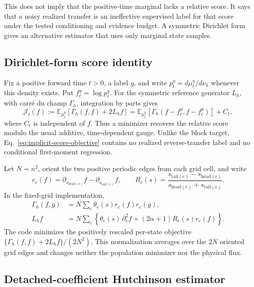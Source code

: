 \documentclass[11pt]{article}
\numberwithin{equation}{section}
\newcommand{\E}{\mathbb E}
\newcommand{\1}{\mathbf 1}
\begin{document}
This does not imply that the positive-time marginal lacks a relative score.
It says that a noisy realized transfer is an ineffective supervised label for
that score under the tested conditioning and evidence budget.  A symmetric
Dirichlet form gives an alternative estimator that uses only marginal state
samples.

\subsection{Dirichlet-form score identity}

Fix a positive forward time \(t>0\), a label \(y\), and write
\(p_t^y=d\mu_t^y/d\nu_h\) whenever this density exists.  Put
\(f_t^y=\log p_t^y\).  For the symmetric reference generator \(L_h\), with
carr\'e du champ \(\Gamma_h\), integration by parts gives
\begin{equation}\label{eq:implicit-score-objective}
  \mathcal J_t(f)
  :=\E_{\mu_t^y}\!\left[\Gamma_h(f,f)+2L_hf\right]
  =\E_{\mu_t^y}\!\left[\Gamma_h(f-f_t^y,f-f_t^y)\right]+C_t,
\end{equation}
where \(C_t\) is independent of \(f\).  Thus a minimizer recovers the relative
score modulo the usual additive, time-dependent gauge.  Unlike the block target,
Eq.~\eqref{eq:implicit-score-objective} contains no realized reverse-transfer
label and no conditional first-moment regression.

Let \(N=n^2\), orient the two positive periodic edges from each grid cell, and
write
\[
  r_e(f)=\partial_{s_{\mathrm{head}(e)}}f-
          \partial_{s_{\mathrm{tail}(e)}}f,
  \qquad
  R_e(s)=\frac{s_{\mathrm{tail}(e)}-s_{\mathrm{head}(e)}}
               {s_{\mathrm{head}(e)}+s_{\mathrm{tail}(e)}}.
\]
In the fixed-grid implementation,
\begin{align}
  \Gamma_h(f,g)
    &=N\sum_e\theta_e(s)r_e(f)r_e(g),\label{eq:implicit-gamma}\\
  L_hf
    &=N\sum_e\left\{
       \theta_e(s)\,\partial_e^2f
       +(2\alpha+1)R_e(s)r_e(f)
      \right\}.\label{eq:implicit-generator}
\end{align}
The code minimizes the positively rescaled per-state objective
\(\{\Gamma_h(f,f)+2L_hf\}/(2N^2)\).  This normalization averages over the
\(2N\) oriented grid edges and changes neither the population minimizer nor the
physical flux.

\subsection{Detached-coefficient Hutchinson estimator}
\end{document}
